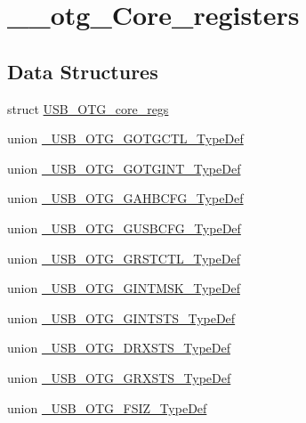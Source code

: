\hypertarget{group______otg___core__registers}{\section{\-\_\-\-\_\-otg\-\_\-\-Core\-\_\-registers}
\label{group______otg___core__registers}
}
\subsection*{Data Structures}
\begin{DoxyCompactItemize}
\item 
struct \hyperlink{struct_u_s_b___o_t_g__core__regs}{U\-S\-B\-\_\-\-O\-T\-G\-\_\-core\-\_\-regs}
\item 
union \hyperlink{union___u_s_b___o_t_g___g_o_t_g_c_t_l___type_def}{\-\_\-\-U\-S\-B\-\_\-\-O\-T\-G\-\_\-\-G\-O\-T\-G\-C\-T\-L\-\_\-\-Type\-Def}
\item 
union \hyperlink{union___u_s_b___o_t_g___g_o_t_g_i_n_t___type_def}{\-\_\-\-U\-S\-B\-\_\-\-O\-T\-G\-\_\-\-G\-O\-T\-G\-I\-N\-T\-\_\-\-Type\-Def}
\item 
union \hyperlink{union___u_s_b___o_t_g___g_a_h_b_c_f_g___type_def}{\-\_\-\-U\-S\-B\-\_\-\-O\-T\-G\-\_\-\-G\-A\-H\-B\-C\-F\-G\-\_\-\-Type\-Def}
\item 
union \hyperlink{union___u_s_b___o_t_g___g_u_s_b_c_f_g___type_def}{\-\_\-\-U\-S\-B\-\_\-\-O\-T\-G\-\_\-\-G\-U\-S\-B\-C\-F\-G\-\_\-\-Type\-Def}
\item 
union \hyperlink{union___u_s_b___o_t_g___g_r_s_t_c_t_l___type_def}{\-\_\-\-U\-S\-B\-\_\-\-O\-T\-G\-\_\-\-G\-R\-S\-T\-C\-T\-L\-\_\-\-Type\-Def}
\item 
union \hyperlink{union___u_s_b___o_t_g___g_i_n_t_m_s_k___type_def}{\-\_\-\-U\-S\-B\-\_\-\-O\-T\-G\-\_\-\-G\-I\-N\-T\-M\-S\-K\-\_\-\-Type\-Def}
\item 
union \hyperlink{union___u_s_b___o_t_g___g_i_n_t_s_t_s___type_def}{\-\_\-\-U\-S\-B\-\_\-\-O\-T\-G\-\_\-\-G\-I\-N\-T\-S\-T\-S\-\_\-\-Type\-Def}
\item 
union \hyperlink{union___u_s_b___o_t_g___d_r_x_s_t_s___type_def}{\-\_\-\-U\-S\-B\-\_\-\-O\-T\-G\-\_\-\-D\-R\-X\-S\-T\-S\-\_\-\-Type\-Def}
\item 
union \hyperlink{union___u_s_b___o_t_g___g_r_x_s_t_s___type_def}{\-\_\-\-U\-S\-B\-\_\-\-O\-T\-G\-\_\-\-G\-R\-X\-S\-T\-S\-\_\-\-Type\-Def}
\item 
union \hyperlink{union___u_s_b___o_t_g___f_s_i_z___type_def}{\-\_\-\-U\-S\-B\-\_\-\-O\-T\-G\-\_\-\-F\-S\-I\-Z\-\_\-\-Type\-Def}

\end{DoxyCompactItemize}
